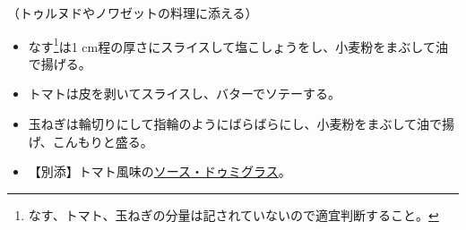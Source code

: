 \begin{recette}
（トゥルヌドやノワゼットの料理に添える）

\begin{itemize}
\item
  なす\footnote{なす、トマト、玉ねぎの分量は記されていないので適宜判断すること。}は1
  cm程の厚さにスライスして塩こしょうをし、小麦粉をまぶして油で揚げる。
\item
  トマトは皮を剥いてスライスし、バターでソテーする。
\item
  玉ねぎは輪切りにして指輪のようにばらばらにし、小麦粉をまぶして油で揚げ、こんもりと盛る。
\item
  【別添】トマト風味の\protect\hyperlink{sauce-demi-glace}{ソース・ドゥミグラス}。
\end{itemize}

\atoaki{}

\hypertarget{garniture-banquiere}{%
}
\end{recette}
